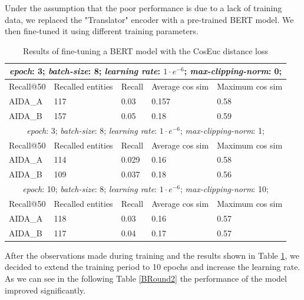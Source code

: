 Under the assumption that the poor performance is due to a lack of training data, we replaced the "Translator" encoder with a pre-trained BERT model. We then fine-tuned it using different training parameters. \newline

\begin{table}[h!]
\centering
\captionsetup{justification=centering,margin=2cm}
\renewcommand{\arraystretch}{1.2}
\begin{tabular}{ |p{3cm}||p{2.5cm}||p{2.5cm}|p{2.5cm}|p{2.5cm}|}
 \hline 
\multicolumn{5}{|c|}{ \textit{epoch}: 3; \textit{batch-size}: 8; \textit{learning rate}: $1 \cdot e^{-6}$; \textit{max-clipping-norm}: 0;} \\
 \hline
  Recall@50 & Recalled entities & Recall  & Average cos sim & Maximum cos sim\\
 \hline 
 AIDA\_A & 117 & 0.03 & 0.157 & 0.58\\
 \hline
 AIDA\_B & 157 & 0.05 & 0.18 & 0.59\\
 \hline
 \multicolumn{5}{|c|}{ \textit{epoch}: 3; \textit{batch-size}: 8; \textit{learning rate}: $1 \cdot e^{-6}$; \textit{max-clipping-norm}: 1;}\\
 \hline   
  Recall@50 & Recalled entities & Recall  & Average cos sim & Maximum cos sim\\
 \hline 
 AIDA\_A & 114 & 0.029 & 0.16 & 0.58\\
 \hline
 AIDA\_B & 109 & 0.037 & 0.18 & 0.56\\
 \hline
 \multicolumn{5}{|c|}{  \textit{epoch}: 10; \textit{batch-size}: 8; \textit{learning rate}: $1 \cdot e^{-6}$; \textit{max-clipping-norm}: 10;}\\
 \hline   
  Recall@50 & Recalled entities & Recall  & Average cos sim & Maximum cos sim\\
 \hline 
 AIDA\_A & 118 & 0.03 & 0.16 & 0.57\\
 \hline
 AIDA\_B & 117 & 0.04 & 0.17 & 0.57\\
 \hline
\end{tabular}
\caption{Results of fine-tuning a BERT model with the CosEuc distance loss}
\label{BRound1}
\end{table}

After the observations made during training and the results shown in Table \ref{BRound1}, we decided to extend the training period to 10 epochs and increase the learning rate. As we can see in the following Table \ref{BRound2} the performance of the model improved significantly.

